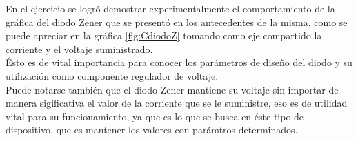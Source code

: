 \documentclass{article}
\begin{document}
En el ejercicio se logró demostrar experimentalmente el comportamiento de la gráfica del diodo Zener que se presentó en los antecedentes de la misma, como se puede apreciar en la gráfica \ref{fig:CdiodoZ} tomando como eje compartido la corriente y el voltaje suministrado.\\

Ésto es de vital importancia para conocer los parámetros de diseño del diodo y su utilización como componente regulador de voltaje.\\

Puede notarse también que el diodo Zener mantiene su voltaje sin importar de manera sigificativa el valor de la corriente que se le suministre, eso es de utilidad vital para su funcionamiento, ya que es lo que se busca en éste tipo de dispositivo, que es mantener los valores con parámtros determinados.\\










\end{document}
